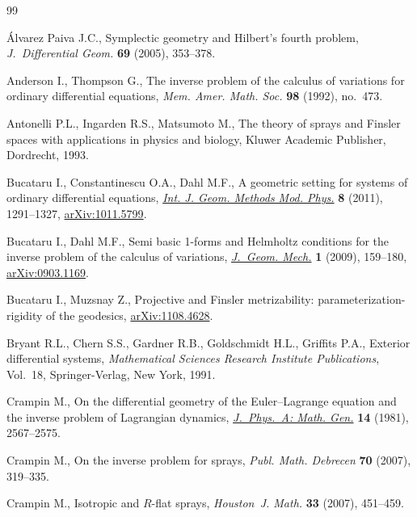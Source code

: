 \documentclass[11pt]{article}
\numberwithin{equation}{section}
\begin{document}
\begin{thebibliography}{99}

\footnotesize\itemsep=0pt

\'Alvarez Paiva J.C.,
Symplectic geometry and Hilbert's fourth problem,
{\it J.~Differential Geom.} {\bf 69} (2005), 353--378.

Anderson I., Thompson G.,
The inverse problem of the calculus of variations for ordinary dif\/ferential equations,
{\it Mem. Amer. Math. Soc.} {\bf 98} (1992),  no.~473.

Antonelli P.L., Ingarden  R.S., Matsumoto M.,
The theory of sprays and Finsler spaces with applications in physics and biology,
Kluwer Academic Publisher, Dordrecht, 1993.

Bucataru I., Constantinescu O.A., Dahl M.F.,
A geometric setting for systems of ordinary dif\/ferential equations,
\href{http://dx.doi.org/10.1142/S0219887811005701}{{\it Int. J. Geom. Methods Mod. Phys.}} {\bf 8} (2011), 1291--1327,
\href{http://arxiv.org/abs/1011.5799}{arXiv:1011.5799}.

Bucataru I., Dahl M.F.,
Semi basic 1-forms and Helmholtz conditions for the inverse problem of the calculus of variations,
\href{http://dx.doi.org/10.3934/jgm.2009.1.159}{{\it J.~Geom. Mech.}}  {\bf 1} (2009), 159--180,
\href{http://arxiv.org/abs/0903.1169}{arXiv:0903.1169}.

Bucataru I., Muzsnay Z.,
Projective and Finsler metrizability: parameterization-rigidity of the geodesics,
\href{http://arxiv.org/abs/1108.4628}{arXiv:1108.4628}.

Bryant R.L., Chern S.S.,  Gardner R.B., Goldschmidt H.L., Grif\/f\/its P.A.,
Exterior dif\/ferential systems, {\it Mathematical Sciences Research Institute Publications}, Vol.~18, Springer-Verlag, New York, 1991.

Crampin M.,
On the dif\/ferential geometry  of the Euler--Lagrange equation and the inverse problem of Lagrangian dynamics,
\href{http://dx.doi.org/10.1088/0305-4470/14/10/012}{{\it  J.~Phys.~A: Math. Gen.}} {\bf 14} (1981), 2567--2575.

Crampin M.,
On the inverse problem for sprays,
{\it Publ. Math. Debrecen} {\bf 70}  (2007), 319--335.

Crampin M.,
Isotropic and $R$-f\/lat sprays,
{\it Houston~J. Math.}  {\bf 33} (2007), 451--459.


\end{thebibliography}
\end{document}
